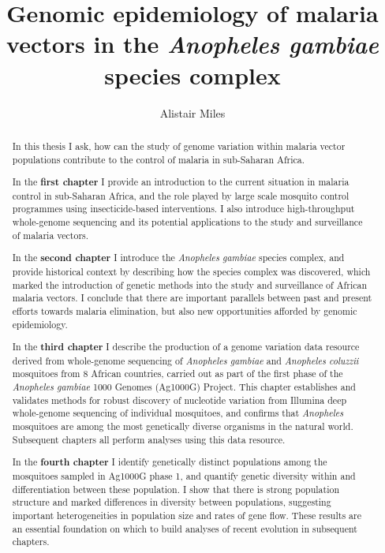 \documentclass[a4paper,11pt,abstracton,hidelinks]{scrartcl}
\title{
Genomic epidemiology of malaria vectors in the \textit{Anopheles gambiae} species complex
}
\author{Alistair Miles}
\begin{document}
\maketitle


\begin{abstract}


In this thesis I ask, how can the study of genome variation within malaria vector populations contribute to the control of malaria in sub-Saharan Africa.


In the \textbf{first chapter} I provide an introduction to the current situation in malaria control in sub-Saharan Africa, and the role played by large scale mosquito control programmes using insecticide-based interventions. I also introduce high-throughput whole-genome sequencing and its potential applications to the study and surveillance of malaria vectors.


In the \textbf{second chapter} I introduce the \textit{Anopheles gambiae} species complex, and provide historical context by describing how the species complex was discovered, which marked the introduction of genetic methods into the study and surveillance of African malaria vectors. I conclude that there are important parallels between past and present efforts towards malaria elimination, but also new opportunities afforded by genomic epidemiology.


In the \textbf{third chapter} I describe the production of a genome variation data resource derived from whole-genome sequencing of \textit{Anopheles gambiae} and \textit{Anopheles coluzzii} mosquitoes from 8 African countries, carried out as part of the first phase of the \textit{Anopheles gambiae} 1000 Genomes (Ag1000G) Project. This chapter establishes and validates methods for robust discovery of nucleotide variation from Illumina deep whole-genome sequencing of individual mosquitoes, and confirms that \textit{Anopheles} mosquitoes are among the most genetically diverse organisms in the natural world. Subsequent chapters all perform analyses using this data resource.


In the \textbf{fourth chapter} I identify genetically distinct populations among the mosquitoes sampled in Ag1000G phase 1, and quantify genetic diversity within and differentiation between these population. I show that there is strong population structure and marked differences in diversity between populations, suggesting important heterogeneities in population size and rates of gene flow. These results are an essential foundation on which to build analyses of recent evolution in subsequent chapters.



\end{abstract}
\end{document}
